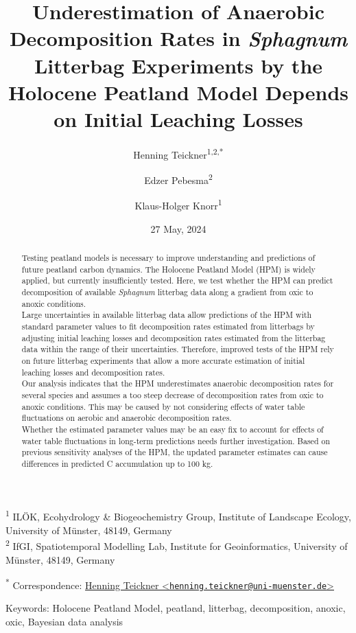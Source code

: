 \documentclass[
  12pt,
]{article}
\title{Underestimation of Anaerobic Decomposition Rates in \emph{Sphagnum} Litterbag Experiments by the Holocene Peatland Model Depends on Initial Leaching Losses}
\author{Henning Teickner\textsuperscript{1,2,*} \and Edzer Pebesma\textsuperscript{2} \and Klaus-Holger Knorr\textsuperscript{1}}
\date{27 May, 2024}
\begin{document}
\maketitle
\begin{abstract}
Testing peatland models is necessary to improve understanding and predictions of future peatland carbon dynamics. The Holocene Peatland Model (HPM) is widely applied, but currently insufficiently tested. Here, we test whether the HPM can predict decomposition of available \emph{Sphagnum} litterbag data along a gradient from oxic to anoxic conditions.\\
Large uncertainties in available litterbag data allow predictions of the HPM with standard parameter values to fit decomposition rates estimated from litterbags by adjusting initial leaching losses and decomposition rates estimated from the litterbag data within the range of their uncertainties. Therefore, improved tests of the HPM rely on future litterbag experiments that allow a more accurate estimation of initial leaching losses and decomposition rates.\\
Our analysis indicates that the HPM underestimates anaerobic decomposition rates for several species and assumes a too steep decrease of decomposition rates from oxic to anoxic conditions. This may be caused by not considering effects of water table fluctuations on aerobic and anaerobic decomposition rates.\\
Whether the estimated parameter values may be an easy fix to account for effects of water table fluctuations in long-term predictions needs further investigation. Based on previous sensitivity analyses of the HPM, the updated parameter estimates can cause differences in predicted C accumulation up to 100 kg.
\end{abstract}

\textsuperscript{1} ILÖK, Ecohydrology \& Biogeochemistry Group, Institute of Landscape Ecology, University of Münster, 48149, Germany\\
\textsuperscript{2} IfGI, Spatiotemporal Modelling Lab, Institute for Geoinformatics, University of Münster, 48149, Germany

\textsuperscript{*} Correspondence: \href{mailto:henning.teickner@uni-muenster.de}{Henning Teickner \textless{}\href{mailto:henning.teickner@uni-muenster.de}{\nolinkurl{henning.teickner@uni-muenster.de}}\textgreater{}}

Keywords: Holocene Peatland Model, peatland, litterbag, decomposition, anoxic, oxic, Bayesian data analysis
\end{document}
